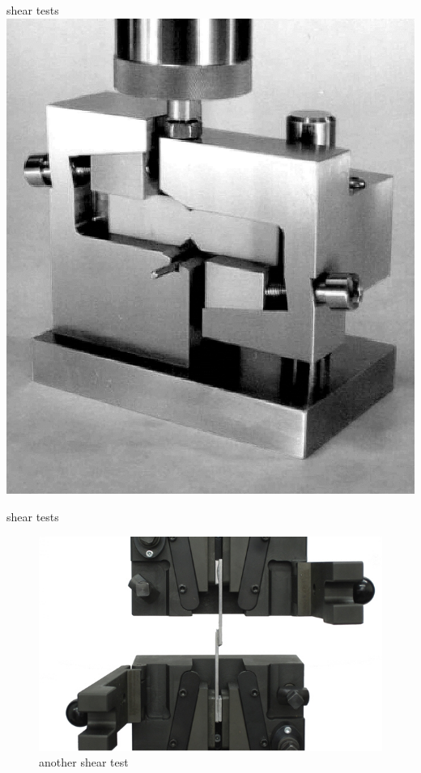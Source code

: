 \documentclass[
  letterpaper,
  ignorenonframetext,
  aspectratio=43,
  handout,
  12pt]{beamer}
\let\Oldincludegraphics\includegraphics
\renewcommand{\includegraphics}[2][]{\Oldincludegraphics[width=\textwidth,height=0.7\textheight,keepaspectratio]{#2}}
\begin{document}
\begin{frame}{shear tests}
\protect\hypertarget{shear-tests}{}
\includegraphics{../images/shear2.jpg}
\end{frame}

\begin{frame}{shear tests}
\protect\hypertarget{shear-tests-1}{}
\begin{figure}
\centering
\includegraphics{../images/shear4.jpg}
\caption{another shear test}
\end{figure}
\end{frame}
\end{document}
